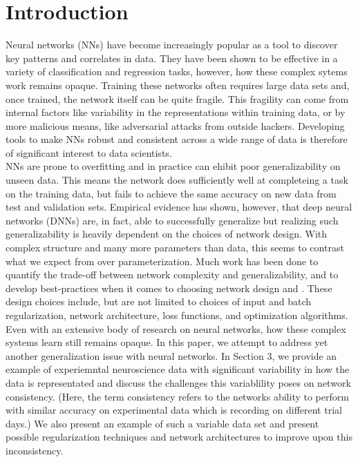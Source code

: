 \documentclass[12pt]{article}
\begin{document}
\section{Introduction}Neural networks (NNs) have become increasingly popular as a tool to discover key patterns and correlates in data. They have been shown to be effective in a variety of classification and regression tasks, however, how these complex sytems work remains opaque. Training these networks often requires large data sets and, once trained, the network itself can be quite fragile. This fragility can come from internal factors like variability in the representations within  training data, or by more malicious means, like adversarial attacks from outside hackers. Developing tools to make NNs robust and consistent across a wide range of data is therefore of significant interest to data scientists. \\
\indent NNs are prone to overfitting and in practice can ehibit poor generalizability on unseen data. This means the network does sufficiently well at completeing a task on the training data, but fails to achieve the same accuracy on new data from test and validation sets. Empirical evidence has shown, however, that deep neural networks (DNNs) are, in fact, able to successfully generalize but realizing such generalizability is heavily dependent on the choices of network design. With complex structure and many more parameters than data, this seems to contrast what we expect from over parameterization.  Much work has been done to quantify the trade-off between network complexity and generalizability, and to develop best-practices when it comes to choosing network design  \cite{zhang} \cite{genNN} \cite{drop_over} and \cite{batchgen}. These design choices include, but are not limited to choices of input and batch regularization, network architecture, loss functions, and optimization algorithms. Even with an extensive body of research on neural networks, how these complex systems learn still remains opaque. In this paper, we attempt to address yet another generalization issue with neural networks.  In Section 3, we provide an example of experiemntal neuroscience data with significant variability in how the data is representated and discuss the challenges this variablility poses on network consistency. (Here, the term consistency refers to the networks ability to perform with similar accuracy on experimental data which is recording on different trial days.)  We also present an example of such a variable data set and present possible regularization techniques and network architectures to improve upon this inconsistency. \\
\end{document}
